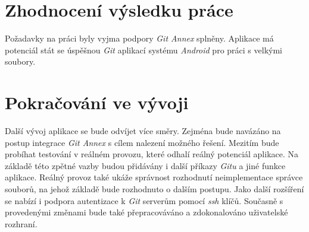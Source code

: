 \section{Zhodnocení výsledku práce}
Požadavky na práci byly vyjma podpory \emph{Git Annex} splněny. Aplikace má potenciál stát se úspěšnou \emph{Git} aplikací systému \emph{Android} pro práci s velkými soubory.

\section{Pokračování ve vývoji}
Další vývoj aplikace se bude odvíjet více směry. Zejména bude navázáno na postup integrace \emph{Git Annex} s cílem nalezení možného řešení. Mezitím bude probíhat testování v reálném provozu, které odhalí reálný potenciál aplikace. Na základě této zpětné vazby budou přidávány i další příkazy \emph{Gitu} a jiné funkce aplikace. Reálný provoz také ukáže správnost rozhodnutí neimplementace správce souborů, na jehož základě bude rozhodnuto o dalším postupu. Jako další rozšíření se nabízí i podpora autentizace k \emph{Git} serverům pomocí \emph{ssh} klíčů. Současně s provedenými změnami bude také přepracováváno a zdokonalováno uživatelské rozhraní.
